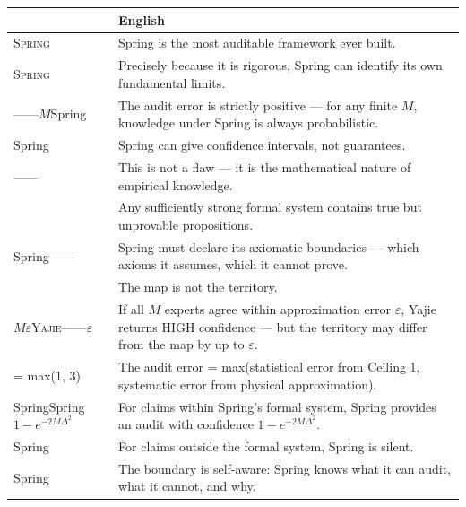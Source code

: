 \documentclass[12pt,a4paper]{article}
\theoremstyle{remark}
\newcommand{\Spring}{\textsc{Spring}}
\newcommand{\Yajie}{\textsc{Yajie}}
\begin{document}
\begin{longtable}{p{6.5cm} p{6.5cm}}
\toprule
\textbf{} & \textbf{English} \\
\midrule
\endhead

\Spring{} & Spring is the most auditable framework ever built. \\
\midrule

\Spring{} & Precisely because it is rigorous, Spring can identify its own fundamental limits. \\
\midrule

——$M$Spring & The audit error is strictly positive — for any finite $M$, knowledge under Spring is always probabilistic. \\
\midrule

Spring & Spring can give confidence intervals, not guarantees. \\
\midrule

—— & This is not a flaw — it is the mathematical nature of empirical knowledge. \\
\midrule

 & Any sufficiently strong formal system contains true but unprovable propositions. \\
\midrule

Spring—— & Spring must declare its axiomatic boundaries — which axioms it assumes, which it cannot prove. \\
\midrule

 & The map is not the territory. \\
\midrule

$M$$\varepsilon$\Yajie{}——$\varepsilon$ & If all $M$ experts agree within approximation error $\varepsilon$, Yajie returns HIGH confidence — but the territory may differ from the map by up to $\varepsilon$. \\
\midrule

 = max(1, 3) & The audit error = max(statistical error from Ceiling 1, systematic error from physical approximation). \\
\midrule

SpringSpring$1-e^{-2M\Delta^2}$ & For claims within Spring's formal system, Spring provides an audit with confidence $1-e^{-2M\Delta^2}$. \\
\midrule

Spring & For claims outside the formal system, Spring is silent. \\
\midrule

Spring & The boundary is self-aware: Spring knows what it can audit, what it cannot, and why. \\
\midrule


\end{longtable}
\end{document}
